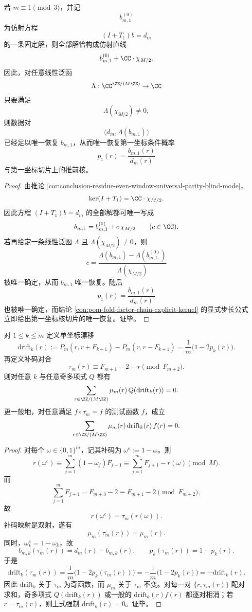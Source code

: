 \begin{corollary}[偶窗口局部不可逆性的单标量横截补全]\label{cor:conclusion-residue-even-window-one-functional-repair}
若 \(m\equiv 1\pmod 3\)，并记
\[
b_{m,1}^{(0)}
\]
为仿射方程
\[
(I+T_1)b=d_m
\]
的一条固定解，则全部解恰构成仿射直线
\[
b_{m,1}^{(0)}+\CC\cdot \chi_{M/2}.
\]
因此，对任意线性泛函
\[
\Lambda:\CC^{\ZZ/(M\ZZ)}\to \CC
\]
只要满足
\[
\Lambda(\chi_{M/2})\neq 0,
\]
则数据对
\[
\bigl(d_m,\Lambda(b_{m,1})\bigr)
\]
已经足以唯一恢复 \(b_{m,1}\)，从而唯一恢复第一坐标条件概率
\[
p_1(r)=\frac{b_{m,1}(r)}{d_m(r)}
\]
与第一坐标切片上的推前核。
\end{corollary}
\begin{proof}
由推论 \ref{cor:conclusion-residue-even-window-universal-parity-blind-mode}，
\[
\ker(I+T_1)=\CC\cdot \chi_{M/2}.
\]
因此方程 \((I+T_1)b=d_m\) 的全部解都可唯一写成
\[
b_{m,1}=b_{m,1}^{(0)}+c\,\chi_{M/2}
\qquad(c\in\CC).
\]
若再给定一条线性泛函 \(\Lambda\) 且 \(\Lambda(\chi_{M/2})\neq 0\)，则
\[
c=
\frac{\Lambda(b_{m,1})-\Lambda(b_{m,1}^{(0)})}{\Lambda(\chi_{M/2})}
\]
被唯一确定，从而 \(b_{m,1}\) 唯一恢复。随后
\[
p_1(r)=\frac{b_{m,1}(r)}{d_m(r)}
\]
也被唯一确定，而结论 \ref{con:pom-fold-factor-chain-explicit-kernel} 的显式步长公式立即给出第一坐标核切片的唯一恢复。证毕。
\end{proof}

\begin{theorem}[条件漂移的一切奇矩湮灭]\label{thm:conclusion-residue-drift-all-odd-moments-vanish}
对 \(1\le k\le m\) 定义单坐标漂移
\[
\mathrm{drift}_k(r)
:=
P_m(r,r+F_{k+1})-P_m(r,r-F_{k+1})
=
\frac{1}{m}\bigl(1-2p_k(r)\bigr).
\]
再定义补码对合
\[
\tau_m(r)\equiv F_{m+1}-2-r \pmod{F_{m+2}}.
\]
则对任意 \(k\) 与任意奇多项式 \(Q\) 都有
\[
\sum_{r\in\ZZ/(M\ZZ)}\mu_m(r)\,Q(\mathrm{drift}_k(r))=0.
\]
更一般地，对任意满足 \(f\circ\tau_m=f\) 的测试函数 \(f\)，成立
\[
\sum_{r\in\ZZ/(M\ZZ)}\mu_m(r)\,\mathrm{drift}_k(r)\,f(r)=0.
\]
\end{theorem}
\begin{proof}
对每个 \(\omega\in\{0,1\}^m\)，记其补码为 \(\omega^c:=1-\omega\)。则
\[
r(\omega^c)
\equiv
\sum_{j=1}^{m}(1-\omega_j)F_{j+1}
\equiv
\sum_{j=1}^{m}F_{j+1}-r(\omega)
\pmod M.
\]
而
\[
\sum_{j=1}^{m}F_{j+1}=F_{m+3}-2\equiv F_{m+1}-2\pmod{F_{m+2}},
\]
故
\[
r(\omega^c)=\tau_m(r(\omega)).
\]
补码映射是双射，遂有
\[
\mu_m(\tau_m(r))=\mu_m(r).
\]
同时，\(\omega_k^c=1-\omega_k\)，故
\[
b_{m,k}(\tau_m(r))=d_m(r)-b_{m,k}(r),
\qquad
p_k(\tau_m(r))=1-p_k(r).
\]
于是
\[
\mathrm{drift}_k(\tau_m(r))
=
\frac{1}{m}\bigl(1-2p_k(\tau_m(r))\bigr)
=
-\frac{1}{m}\bigl(1-2p_k(r)\bigr)
=
-\mathrm{drift}_k(r).
\]
因此 \(\mathrm{drift}_k\) 关于 \(\tau_m\) 为奇函数，而 \(\mu_m\) 关于 \(\tau_m\) 不变。对每一对 \(\{r,\tau_m(r)\}\) 配对求和，奇多项式 \(Q(\mathrm{drift}_k(r))\) 或一般的 \(\mathrm{drift}_k(r)f(r)\) 都逐对相消；若 \(r=\tau_m(r)\)，则上式强制 \(\mathrm{drift}_k(r)=0\)。证毕。
\end{proof}

